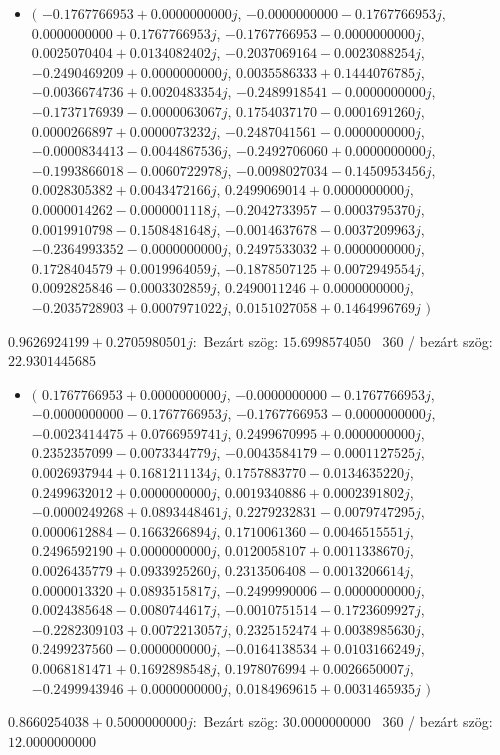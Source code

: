 \documentclass[14pt,a4paper]{article}
\begin{document}
\begin{itemize}
\item
$\big($
$-0.1767766953+0.0000000000j$, $-0.0000000000-0.1767766953j$, $0.0000000000+0.1767766953j$, $-0.1767766953-0.0000000000j$, $0.0025070404+0.0134082402j$, $-0.2037069164-0.0023088254j$, $-0.2490469209+0.0000000000j$, $0.0035586333+0.1444076785j$, $-0.0036674736+0.0020483354j$, $-0.2489918541-0.0000000000j$, $-0.1737176939-0.0000063067j$, $0.1754037170-0.0001691260j$, $0.0000266897+0.0000073232j$, $-0.2487041561-0.0000000000j$, $-0.0000834413-0.0044867536j$, $-0.2492706060+0.0000000000j$, $-0.1993866018-0.0060722978j$, $-0.0098027034-0.1450953456j$, $0.0028305382+0.0043472166j$, $0.2499069014+0.0000000000j$, $0.0000014262-0.0000001118j$, $-0.2042733957-0.0003795370j$, $0.0019910798-0.1508481648j$, $-0.0014637678-0.0037209963j$, $-0.2364993352-0.0000000000j$, $0.2497533032+0.0000000000j$, $0.1728404579+0.0019964059j$, $-0.1878507125+0.0072949554j$, $0.0092825846-0.0003302859j$, $0.2490011246+0.0000000000j$, $-0.2035728903+0.0007971022j$, $0.0151027058+0.1464996769j$
$\big)$
\end{itemize}
$0.9626924199+0.2705980501j$:\
Bezárt szög: $15.6998574050$ \
360 / bezárt szög: $22.9301445685$\
\begin{itemize}
\item
$\big($
$0.1767766953+0.0000000000j$, $-0.0000000000-0.1767766953j$, $-0.0000000000-0.1767766953j$, $-0.1767766953-0.0000000000j$, $-0.0023414475+0.0766959741j$, $0.2499670995+0.0000000000j$, $0.2352357099-0.0073344779j$, $-0.0043584179-0.0001127525j$, $0.0026937944+0.1681211134j$, $0.1757883770-0.0134635220j$, $0.2499632012+0.0000000000j$, $0.0019340886+0.0002391802j$, $-0.0000249268+0.0893448461j$, $0.2279232831-0.0079747295j$, $0.0000612884-0.1663266894j$, $0.1710061360-0.0046515551j$, $0.2496592190+0.0000000000j$, $0.0120058107+0.0011338670j$, $0.0026435779+0.0933925260j$, $0.2313506408-0.0013206614j$, $0.0000013320+0.0893515817j$, $-0.2499990006-0.0000000000j$, $0.0024385648-0.0080744617j$, $-0.0010751514-0.1723609927j$, $-0.2282309103+0.0072213057j$, $0.2325152474+0.0038985630j$, $0.2499237560-0.0000000000j$, $-0.0164138534+0.0103166249j$, $0.0068181471+0.1692898548j$, $0.1978076994+0.0026650007j$, $-0.2499943946+0.0000000000j$, $0.0184969615+0.0031465935j$
$\big)$
\end{itemize}
$0.8660254038+0.5000000000j$:\
Bezárt szög: $30.0000000000$ \
360 / bezárt szög: $12.0000000000$\
\end{document}

